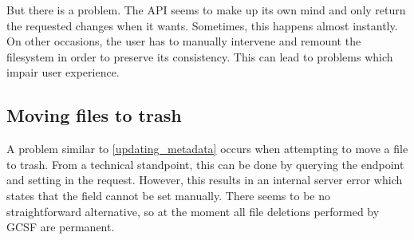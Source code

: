 But there is a problem. The API seems to make up its own mind and only return the requested changes when it wants. Sometimes, this happens almost instantly. On other occasions, the user has to manually intervene and remount the filesystem in order to preserve its consistency. This can lead to problems which impair user experience.

\subsection{Moving files to trash}

A problem similar to \ref{updating_metadata} occurs when attempting to move a file to trash. From a technical standpoint, this can be done by querying the  endpoint and setting  in the request. However, this results in an internal server error which states that the  field cannot be set manually. There seems to be no straightforward alternative, so at the moment all file deletions performed by GCSF are permanent.
